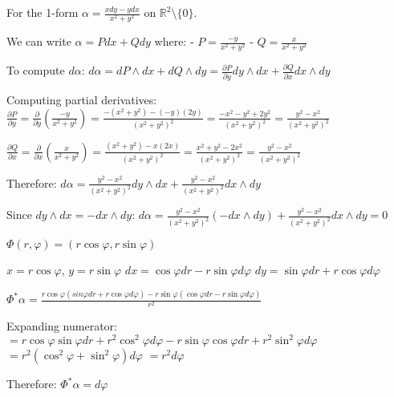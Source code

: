 \documentclass{article}
\begin{document}

For the 1-form $\alpha = \frac{x dy - y dx}{x^2 + y^2}$ on $\mathbb{R}^2 \setminus \{0\}$.

We can write $\alpha = P dx + Q dy$ where:
- $P = \frac{-y}{x^2 + y^2}$
- $Q = \frac{x}{x^2 + y^2}$

To compute $d\alpha$:
$d\alpha = dP \wedge dx + dQ \wedge dy = \frac{\partial P}{\partial y} dy \wedge dx + \frac{\partial Q}{\partial x} dx \wedge dy$

Computing partial derivatives:
$\frac{\partial P}{\partial y} = \frac{\partial}{\partial y}\left(\frac{-y}{x^2 + y^2}\right) = \frac{-(x^2 + y^2) - (-y)(2y)}{(x^2 + y^2)^2} = \frac{-x^2 - y^2 + 2y^2}{(x^2 + y^2)^2} = \frac{y^2 - x^2}{(x^2 + y^2)^2}$

$\frac{\partial Q}{\partial x} = \frac{\partial}{\partial x}\left(\frac{x}{x^2 + y^2}\right) = \frac{(x^2 + y^2) - x(2x)}{(x^2 + y^2)^2} = \frac{x^2 + y^2 - 2x^2}{(x^2 + y^2)^2} = \frac{y^2 - x^2}{(x^2 + y^2)^2}$

Therefore:
$d\alpha = \frac{y^2 - x^2}{(x^2 + y^2)^2} dy \wedge dx + \frac{y^2 - x^2}{(x^2 + y^2)^2} dx \wedge dy$

Since $dy \wedge dx = -dx \wedge dy$:
$d\alpha = \frac{y^2 - x^2}{(x^2 + y^2)^2} (-dx \wedge dy) + \frac{y^2 - x^2}{(x^2 + y^2)^2} dx \wedge dy = 0$

$\Phi(r, \varphi) = (r\cos\varphi, r\sin\varphi)$

$x = r\cos\varphi$, $y = r\sin\varphi$
$dx = \cos\varphi dr - r\sin\varphi d\varphi$
$dy = \sin\varphi dr + r\cos\varphi d\varphi$

$\Phi^*\alpha = \frac{r\cos\varphi(sin\varphi dr + r\cos\varphi d\varphi) - r\sin\varphi(\cos\varphi dr - r\sin\varphi d\varphi)}{r^2}$

Expanding numerator:
$= r\cos\varphi\sin\varphi dr + r^2\cos^2\varphi d\varphi - r\sin\varphi\cos\varphi dr + r^2\sin^2\varphi d\varphi$
$= r^2(\cos^2\varphi + \sin^2\varphi) d\varphi$
$= r^2 d\varphi$

Therefore: $\Phi^*\alpha = d\varphi$
\end{document}
